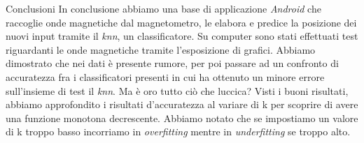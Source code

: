 \documentclass[11pt]{beamer}
\begin{document}
	\begin{frame}{Conclusioni}
		In conclusione abbiamo una base di applicazione \textit{Android} che raccoglie onde magnetiche dal magnetometro, le elabora e predice la posizione dei nuovi input tramite il \textit{knn}, un classificatore.
		Su computer sono stati effettuati test riguardanti  le onde magnetiche tramite l'esposizione di grafici. Abbiamo dimostrato che nei dati \`e presente rumore, per poi passare ad un confronto di accuratezza fra i classificatori presenti in cui ha ottenuto un minore errore sull'insieme di test il \textit{knn}. Ma \`e oro tutto ci\`o che luccica? Visti i buoni risultati, abbiamo approfondito  i risultati d'accuratezza al variare di k per scoprire di avere una funzione monotona decrescente. Abbiamo notato che se impostiamo un valore di k troppo basso incorriamo in \textit{overfitting} mentre in \textit{underfitting} se troppo alto.
	\end{frame}
\end{document}
